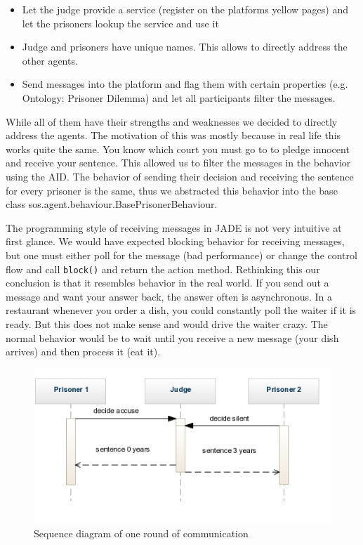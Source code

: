 \documentclass{acm_proc_article-sp}
\begin{document}
\begin{itemize}
	\item Let the judge provide a service (register on the platforms yellow pages) and let
    the prisoners lookup the service and use it
    \item Judge and prisoners have unique names. This allows to directly address the other
    agents.
    \item Send messages into the platform and flag them with certain properties (e.g. Ontology: Prisoner Dilemma) and let all participants filter the messages.
\end{itemize}

While all of them have their strengths and weaknesses we decided to directly address the agents.
The motivation of this was mostly because in real life this works quite the same. You
know which court you must go to to pledge innocent and receive your sentence. This allowed
us to filter the messages in the behavior using the AID. The behavior of sending their
decision and receiving the sentence for every prisoner is the same,
thus we abstracted this behavior into the base class sos.agent.behaviour.BasePrisonerBehaviour.

The programming style of receiving messages in JADE is not very intuitive at first glance.
We would have expected blocking behavior for receiving messages, but one must either
poll for the message (bad performance) or change the control flow and call \lstinline!block()! 
and return the action method. Rethinking this our conclusion is that it resembles behavior in the real world. If you send out a message and want your answer back, the answer often is
asynchronous. In a restaurant whenever you order a dish, you could constantly poll the waiter if it is ready. But this does not make sense and would drive the waiter crazy. The normal
behavior would be to wait until you receive a new message (your dish arrives) and then process it (eat it).

\begin{figure}
\begin{center}
\includegraphics{dilemma-sequence}
\end{center}
\caption{Sequence diagram of one round of communication}
\label{fig:dilemma-sequence}
\end{figure}
\end{document}
